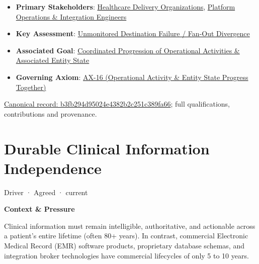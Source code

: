 \begin{itemize}


\item \textbf{Primary Stakeholders}: \href{\detokenize{../../../../../docs/markdown/01-motivation/stakeholders/enterprise-stakeholders.md}}{Healthcare Delivery Organizations}, \href{\detokenize{../../../../../docs/markdown/01-motivation/stakeholders/enterprise-stakeholders.md}}{Platform Operations \& Integration Engineers}

\item \textbf{Key Assessment}: \href{\detokenize{../../../../../docs/markdown/01-motivation/drivers-assessments/assessments.md}}{Unmonitored Destination Failure / Fan-Out Divergence}

\item \textbf{Associated Goal}: \href{\detokenize{../../../../../docs/markdown/01-motivation/goals-outcomes/strategic-goals.md}}{Coordinated Progression of Operational Activities \& Associated Entity State}

\item \textbf{Governing Axiom}: \hyperref[element:de7e90f46127455a9ec9ad3b9b48ba54]{AX-16 (Operational Activity \& Entity State Progress Together)}

\end{itemize}

{\footnotesize \href{../../../../continuum/motivation/driver/b3fb294d95024e4382b2c251c389fa66.md}{Canonical record: b3fb294d95024e4382b2c251c389fa66}; full qualifications, contributions and provenance.}\par
\section{Durable Clinical Information Independence}

\label{element:3d81912dd8c94603ba0e10c98b7a62d8}
{\small Driver · Agreed · current}\par

\par\medskip\textbf{Context \& Pressure}\par


Clinical information must remain intelligible, authoritative, and actionable across a patient's entire lifetime (often 80+ years). In contrast, commercial Electronic Medical Record (EMR) software products, proprietary database schemas, and integration broker technologies have commercial lifecycles of only 5 to 10 years.




